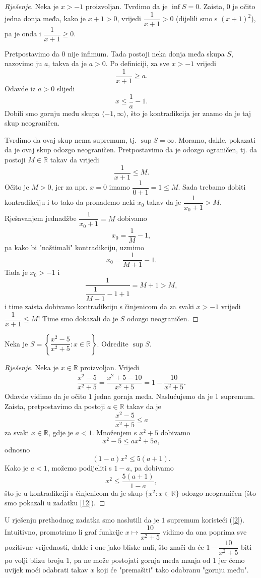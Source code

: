 \begin{proof}[Rješenje]
Neka je $x>-1$ proizvoljan. Tvrdimo da je $\inf{S}=0$. Zaista, $0$ je očito jedna donja međa, kako je $x+1>0$, vrijedi $\dfrac{1}{x+1}>0$ (dijelili smo s $(x+1)^2$), pa je onda i $\dfrac{1}{x+1}\geq 0.$ 

Pretpostavimo da $0$ nije infimum. Tada postoji neka donja međa skupa $S$, nazovimo ju $a$, takva da je $a>0$. Po definiciji, za sve $x>-1$ vrijedi $$\dfrac{1}{x+1}\geq a.$$ Odavde iz $a>0$ slijedi $$x\leq \dfrac{1}{a}-1.$$ 
Dobili smo gornju među skupa $\langle-1, \infty\rangle$, što je kontradikcija jer znamo da je taj skup neograničen.

Tvrdimo da ovaj skup nema supremum, tj. $\sup{S}=\infty$. Moramo, dakle, pokazati da je ovaj skup odozgo neograničen. Pretpostavimo da je odozgo ograničen, tj. da postoji $M\in \mathbb{R}$ takav da vrijedi 
$$\dfrac{1}{x+1}\leq M.$$
Očito je $M>0$, jer za npr. $x=0$ imamo $\dfrac{1}{0+1}=1\leq M$. Sada trebamo dobiti kontradikciju i to tako da pronađemo neki $x_0$ takav da je $\dfrac{1}{x_0+1}>M$. Rješavanjem jednadžbe $\dfrac{1}{x_0+1}=M$ dobivamo $$x_0=\dfrac{1}{M}-1,$$ pa kako bi "naštimali" kontradikciju, uzmimo 
$$x_0=\dfrac{1}{M+1}-1.$$ 
Tada je $x_0>-1$ i
$$\dfrac{1}{\dfrac{1}{M+1}-1+1}=M+1>M,$$ i time zaista dobivamo kontradikciju s činjenicom da za svaki $x> -1$ vrijedi $\dfrac{1}{x+1}\leq M$! Time smo dokazali da je $S$ odozgo neograničen.
\end{proof}
\begin{exercise}
\label{11}
Neka je $S=\left\{\dfrac{x^2-5}{x^2+5} : x\in \mathbb{R}\right\}$. Odredite $\sup{S}$.
\end{exercise}
\begin{proof}[Rješenje]
Neka je $x\in \mathbb{R}$ proizvoljan. Vrijedi
\begin{gather}
\label{2}
\dfrac{x^2-5}{x^2+5}=\dfrac{x^2+5-10}{x^2+5}=1-\dfrac{10}{x^2+5}.
\end{gather}
Odavde vidimo da je očito $1$ jedna gornja međa. Naslućujemo da je $1$ supremum. Zaista, pretpostavimo da postoji $a\in \mathbb{R}$ takav da je $$\dfrac{x^2-5}{x^2+5}\leq a$$ za svaki $x\in \mathbb{R}$, gdje je $a<1$. Množenjem s $x^2+5$ dobivamo $$x^2-5\leq ax^2+5a,$$ odnosno $$(1-a)x^2\leq 5(a+1).$$ Kako je $a<1$, možemo podijeliti s $1-a$, pa dobivamo $$x^2\leq \dfrac{5(a+1)}{1-a},$$
što je u kontradikciji s činjenicom da je skup $\{x^2 : x\in \mathbb{R}\}$ odozgo neograničen (što smo pokazali u zadatku \ref{12}).
\end{proof}
U rješenju prethodnog zadatka smo naslutili da je $1$ supremum koristeći (\ref{2}). Intuitivno, promotrimo li graf funkcije $x\mapsto \dfrac{10}{x^2+5}$ vidimo da ona poprima sve pozitivne vrijednosti, dakle i one jako bliske nuli, što znači da će $1-\dfrac{10}{x^2+5}$ biti po volji blizu broju $1$, pa ne može postojati gornja međa manja od $1$ jer ćemo uvijek moći odabrati takav $x$ koji će "premašiti" tako odabranu "gornju među".
